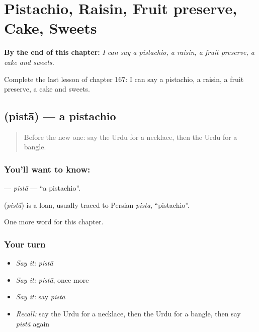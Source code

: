 
\chapter{Pistachio, Raisin, Fruit preserve, Cake, Sweets}
\label{ch:ur-pistachio-raisin-fruit-preserve-cake-sweets}

\begin{chapteropening}
\textbf{By the end of this chapter:} \emph{I can say a pistachio, a raisin, a fruit preserve, a cake and sweets.}

Complete the last lesson of chapter 167: I can say a pistachio, a raisin, a fruit preserve, a cake and sweets.
\end{chapteropening}

\section[\texorpdfstring{\ur{پستہ} (pistā)}{پستہ (pistā)}]{ (pistā) — a pistachio}

\label{lesson:UR-C167-pista}



\begin{quote}
Before the new one: say the Urdu for a necklace, then the Urdu for a bangle.
\end{quote}

\subsection*{You'll want to know: }
\textbf{} — \emph{pistā} — \textquotedblleft{}a pistachio\textquotedblright{}.

\begin{cousinweb}
\textbf{} (\emph{pistā}) is a loan, usually traced to Persian \emph{pista}, \textquotedblleft{}pistachio\textquotedblright{}.
\end{cousinweb}

\begin{grammarlens}[title={What you've built}]
One more word for this chapter.
\end{grammarlens}

\subsection*{Your turn}
\begin{itemize}
\raggedright
  \item \emph{Say it:} \emph{pistā}
  \item \emph{Say it:} \emph{pistā}, once more
  \item \emph{Say it:} say \emph{pistā}
  \item \emph{Recall:} say the Urdu for a necklace, then the Urdu for a bangle, then say \emph{pistā} again
\end{itemize}


